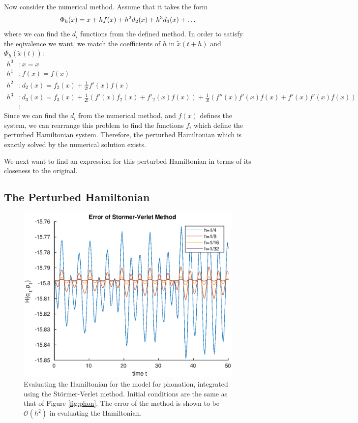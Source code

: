 \documentclass{report}
\theoremstyle{exampstyle} \newtheorem{example}[theorem]{Example}
\theoremstyle{exampstyle} \newtheorem{remark}[theorem]{Remark}
\theoremstyle{exampstyle} \newtheorem{definition}[theorem]{Definition}
\theoremstyle{exampstyle} \newtheorem{lemma}[theorem]{Lemma}
\theoremstyle{exampstyle} \newtheorem{proposition}[theorem]{Proposition}
\begin{document}
Now consider the numerical method. Assume that it takes the form
\begin{equation*}
	\Phi_h(x) = x + h f(x) + h^2 d_2(x) + h^3 d_3(x) + \mathellipsis
\end{equation*}
where we can find the $d_i$ functions from the defined method. In order to satisfy the eqivalence we want, we match the coefficients of $h$ in $\tilde{x}(t+h)$ and $\Phi_h(\tilde{x}(t))$:
\begin{align*}
	h^0 &: x=x \\
	h^1 &: f(x) = f(x) \\
	h^2 &: d_2(x) = f_2(x) + \frac{1}{2!}f'(x)f(x) \\
	h^3 &: d_3(x) = f_3(x) + \frac{1}{2!}(f'(x)f_2(x) + f'_2(x)f(x)) + \frac{1}{3!}(f''(x)f'(x)f(x) + f'(x)f'(x)f(x)) \\
	& \vdots
\end{align*}
Since we can find the $d_i$ from the numerical method, and $f(x)$ defines the system,
we can rearrange this problem to find the functions $f_i$ which define the perturbed Hamiltonian system.
Therefore, the perturbed Hamiltonian which is exactly solved by the numerical solution exists. 

We next want to find an expression for this perturbed Hamiltonian in terms of its closeness to the original.

\subsection{The Perturbed Hamiltonian}

\begin{figure}
	\centering
	\includegraphics[width = 0.5\linewidth]{figures/phonationerr.eps}
	\caption{
		Evaluating the Hamiltonian for the model for phonation, integrated using the St\"ormer-Verlet method.
		Initial conditions are the same as that of Figure \ref{fig:phon}.
		The error of the method is shown to be $\mathcal{O}(h^2)$ in evaluating the Hamiltonian.
	}
	\label{fig:phonhamil}
\end{figure}
\end{document}
